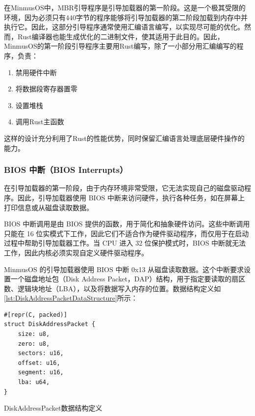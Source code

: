 在MinmusOS中，MBR引导程序是引导加载器的第一阶段。这是一个极其受限的环境，因为必须只有440字节的程序能够将引导加载器的第二阶段加载到内存中并执行它。因此，这部分引导程序通常使用汇编语言编写，以实现尽可能的优化。然而，Rust编译器也能生成优化的二进制文件，使其适用于此目的。因此，MinmusOS的第一阶段引导程序主要用Rust编写，除了一小部分用汇编编写的程序，负责：

\begin{enumerate}
    \item 禁用硬件中断
    \item 将数据段寄存器置零
    \item 设置堆栈
    \item 调用Rust主函数
\end{enumerate}

这样的设计充分利用了Rust的性能优势，同时保留汇编语言处理底层硬件操作的能力。

\subsubsection{BIOS 中断（BIOS Interrupts）}

在引导加载器的第一阶段，由于内存环境非常受限，它无法实现自己的磁盘驱动程序。因此，引导加载器使用 BIOS 中断来访问硬件，执行各种任务，如在屏幕上打印信息或从磁盘读取数据。

BIOS 中断调用是由 BIOS 提供的函数，用于简化和抽象硬件访问。这些中断调用只能在 16 位实模式下工作，因此它们不适合作为硬件驱动程序，而仅用于在启动过程中帮助引导加载器工作。当 CPU 进入 32 位保护模式时，BIOS 中断就无法工作，因此内核必须实现自定义硬件驱动程序。

MinmusOS 的引导加载器使用 BIOS 中断 0x13 从磁盘读取数据。这个中断要求设置一个磁盘地址包（Disk Address Packet，DAP）结构，用于指定要读取的扇区数、逻辑块地址（LBA），以及将数据写入内存的位置。数据结构定义如\cref{lst:DiskAddressPacketDataStructure}所示：

\begin{listing}[htbp]
    \begin{verbatim}
#[repr(C, packed)]
struct DiskAddressPacket {
    size: u8,
    zero: u8,
    sectors: u16,
    offset: u16,
    segment: u16,
    lba: u64,
}
    \end{verbatim}
    \caption{DiskAddressPacket数据结构定义}\label{lst:DiskAddressPacketDataStructure}
\end{listing}


